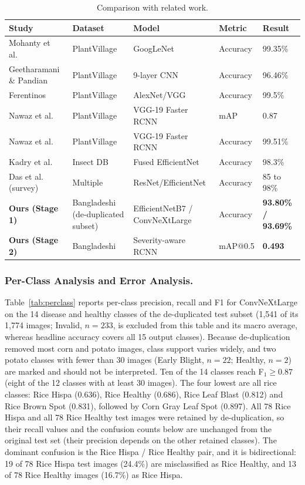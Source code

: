 \begin{table}[!htbp]
\centering
\caption{Comparison with related work.}
\label{tab:priorwork}
\setlength{\tabcolsep}{4pt}
{\small
\begin{tabular}{L{3.0cm}L{2.5cm}L{2.5cm}ll}
\toprule
\textbf{Study} & \textbf{Dataset} & \textbf{Model} &
\textbf{Metric} & \textbf{Result}\\
\midrule
Mohanty et al.~\cite{mohanty2016} & PlantVillage & GoogLeNet & Accuracy & 99.35\%\\
Geetharamani \& Pandian~\cite{geetharamani2019} & PlantVillage & 9-layer CNN & Accuracy & 96.46\%\\
Ferentinos~\cite{ferentinos2018} & PlantVillage & AlexNet/VGG & Accuracy & 99.5\%\\
Nawaz et al.~\cite{nawaz2023} & PlantVillage & VGG-19 Faster RCNN & mAP & 0.87\\
Nawaz et al.~\cite{nawaz2023} & PlantVillage & VGG-19 Faster RCNN & Accuracy & 99.51\%\\
Kadry et al.~\cite{kadry2025} & Insect DB & Fused EfficientNet & Accuracy & 98.3\%\\
Das et al.~\cite{das2024} (survey) & Multiple & ResNet/EfficientNet & Accuracy & 85 to 98\%\\
\midrule
\textbf{Ours (Stage 1)} & Bangladeshi (de-duplicated subset) & EfficientNetB7 / ConvNeXtLarge & Accuracy & \textbf{93.80\% / 93.69\%}\\
\textbf{Ours (Stage 2)} & Bangladeshi & Severity-aware RCNN & mAP@0.5 & \textbf{0.493}\\
\bottomrule
\end{tabular}
}
\end{table}

\subsubsection{Per-Class Analysis and Error Analysis.}
\label{sec:perclass}
Table~\ref{tab:perclass} reports per-class precision, recall and F1 for ConvNeXtLarge on the 14 disease and healthy classes of the de-duplicated test subset (1,541 of its 1,774 images; Invalid, $n=233$, is excluded from this table and its macro average, whereas headline accuracy covers all 15 output classes). Because de-duplication removed most corn and potato images, class support varies widely, and two potato classes with fewer than 30 images (Early Blight, $n=22$; Healthy, $n=2$) are marked and should not be interpreted. Ten of the 14 classes reach F$_1\ge0.87$ (eight of the 12 classes with at least 30 images). The four lowest are all rice classes: Rice Hispa (0.636), Rice Healthy (0.686), Rice Leaf Blast (0.812) and Rice Brown Spot (0.831), followed by Corn Gray Leaf Spot (0.897). All 78 Rice Hispa and all 78 Rice Healthy test images were retained by de-duplication, so their recall values and the confusion counts below are unchanged from the original test set (their precision depends on the other retained classes). The dominant confusion is the Rice Hispa / Rice Healthy pair, and it is bidirectional: 19 of 78 Rice Hispa test images (24.4\%) are misclassified as Rice Healthy, and 13 of 78 Rice Healthy images (16.7\%) as Rice Hispa.

